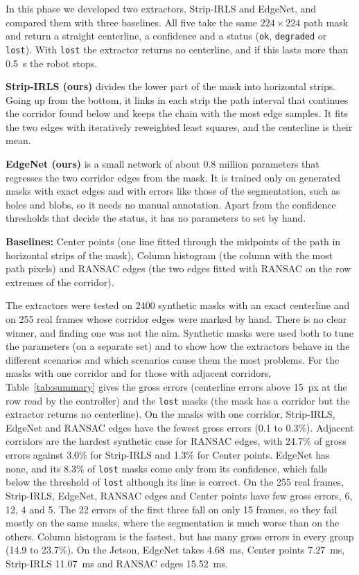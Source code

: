 \documentclass[10pt,a4paper,twocolumn]{article}
\begin{document}
In this phase we developed two extractors, Strip-IRLS and EdgeNet, and compared them with three baselines. All five take the same $224\times224$ path mask and return a straight centerline, a confidence and a status (\texttt{ok}, \texttt{degraded} or \texttt{lost}). With \texttt{lost} the extractor returns no centerline, and if this lasts more than 0.5~s the robot stops.

\textbf{Strip-IRLS (ours)} divides the lower part of the mask into horizontal strips. Going up from the bottom, it links in each strip the path interval that continues the corridor found below and keeps the chain with the most edge samples. It fits the two edges with iteratively reweighted least squares, and the centerline is their mean.

\textbf{EdgeNet (ours)} is a small network of about 0.8 million parameters that regresses the two corridor edges from the mask. It is trained only on generated masks with exact edges and with errors like those of the segmentation, such as holes and blobs, so it needs no manual annotation. Apart from the confidence thresholds that decide the status, it has no parameters to set by hand.

\textbf{Baselines:} Center points (one line fitted through the midpoints of the path in horizontal strips of the mask), Column histogram (the column with the most path pixels) and RANSAC edges (the two edges fitted with RANSAC on the row extremes of the corridor).


The extractors were tested on 2400 synthetic masks with an exact centerline and on 255 real frames whose corridor edges were marked by hand. There is no clear winner, and finding one was not the aim. Synthetic masks were used both to tune the parameters (on a separate set) and to show how the extractors behave in the different scenarios and which scenarios cause them the most problems. For the masks with one corridor and for those with adjacent corridors, Table~\ref{tab:summary} gives the gross errors (centerline errors above 15~px at the row read by the controller) and the \texttt{lost} masks (the mask has a corridor but the extractor returns no centerline). On the masks with one corridor, Strip-IRLS, EdgeNet and RANSAC edges have the fewest gross errors (0.1 to 0.3\%). Adjacent corridors are the hardest synthetic case for RANSAC edges, with 24.7\% of gross errors against 3.0\% for Strip-IRLS and 1.3\% for Center points. EdgeNet has none, and its 8.3\% of \texttt{lost} masks come only from its confidence, which falls below the threshold of \texttt{lost} although its line is correct. On the 255 real frames, Strip-IRLS, EdgeNet, RANSAC edges and Center points have few gross errors, 6, 12, 4 and 5. The 22 errors of the first three fall on only 15 frames, so they fail mostly on the same masks, where the segmentation is much worse than on the others. Column histogram is the fastest, but has many gross errors in every group (14.9 to 23.7\%). On the Jetson, EdgeNet takes 4.68~ms, Center points 7.27~ms, Strip-IRLS 11.07~ms and RANSAC edges 15.52~ms.
\end{document}
